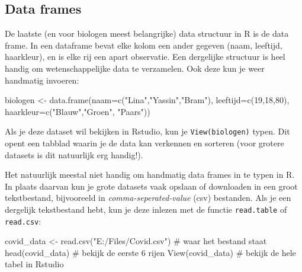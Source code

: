 \documentclass[
  a4paper,
]{scrbook}
\newenvironment{Shaded}{\begin{snugshade}}{\end{snugshade}}
\newcommand{\AttributeTok}[1]{\textcolor[rgb]{0.40,0.45,0.13}{#1}}
\newcommand{\CommentTok}[1]{\textcolor[rgb]{0.37,0.37,0.37}{#1}}
\newcommand{\DecValTok}[1]{\textcolor[rgb]{0.68,0.00,0.00}{#1}}
\newcommand{\FunctionTok}[1]{\textcolor[rgb]{0.28,0.35,0.67}{#1}}
\newcommand{\NormalTok}[1]{\textcolor[rgb]{0.00,0.23,0.31}{#1}}
\newcommand{\OtherTok}[1]{\textcolor[rgb]{0.00,0.23,0.31}{#1}}
\newcommand{\StringTok}[1]{\textcolor[rgb]{0.13,0.47,0.30}{#1}}
\theoremstyle{definition}
\theoremstyle{remark}
\begin{document}
\hypertarget{data-frames}{%
\subsection{Data frames}\label{data-frames}}

De laatste (en voor biologen meest belangrijke) data structuur in R is
de data frame. In een dataframe bevat elke kolom een ander gegeven
(naam, leeftijd, haarkleur), en is elke rij een apart observatie. Een
dergelijke structuur is heel handig om wetenschappelijke data te
verzamelen. Ook deze kun je weer handmatig invoeren:

\begin{Shaded}
\begin{Highlighting}[]
\NormalTok{biologen }\OtherTok{\textless{}{-}} \FunctionTok{data.frame}\NormalTok{(}\AttributeTok{naam=}\FunctionTok{c}\NormalTok{(}\StringTok{"Lina"}\NormalTok{,}\StringTok{"Yassin"}\NormalTok{,}\StringTok{"Bram"}\NormalTok{),}
                       \AttributeTok{leeftijd=}\FunctionTok{c}\NormalTok{(}\DecValTok{19}\NormalTok{,}\DecValTok{18}\NormalTok{,}\DecValTok{80}\NormalTok{), }
                       \AttributeTok{haarkleur=}\FunctionTok{c}\NormalTok{(}\StringTok{"Blauw"}\NormalTok{,}\StringTok{"Groen"}\NormalTok{, }\StringTok{"Paars"}\NormalTok{))}
\end{Highlighting}
\end{Shaded}

Als je deze dataset wil bekijken in Rstudio, kun je
\texttt{View(biologen)} typen. Dit opent een tabblad waarin je de data
kan verkennen en sorteren (voor grotere datasets is dit natuurlijk erg
handig!).

Het natuurlijk meestal niet handig om handmatig data frames in te typen
in R. In plaats daarvan kun je grote datasets vaak opslaan of downloaden
in een groot tekstbestand, bijvooreeld in \emph{comma-seperated-value}
(csv) bestanden. Als je een dergelijk tekstbestand hebt, kun je deze
inlezen met de functie \texttt{read.table} of \texttt{read.csv}:

\begin{Shaded}
\begin{Highlighting}[]
\NormalTok{covid\_data }\OtherTok{\textless{}{-}} \FunctionTok{read.csv}\NormalTok{(}\StringTok{"E:/Files/Covid.csv"}\NormalTok{) }\CommentTok{\# waar het bestand staat}
\FunctionTok{head}\NormalTok{(covid\_data) }\CommentTok{\# bekijk de eerste 6 rijen}
\FunctionTok{View}\NormalTok{(covid\_data) }\CommentTok{\# bekijk de hele tabel in Rstudio}
\end{Highlighting}
\end{Shaded}
\end{document}

